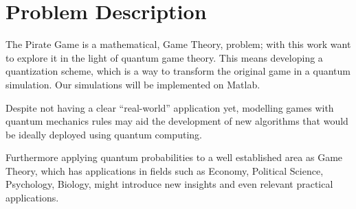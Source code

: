 \section{Problem Description}
\label{sec:int_problem}

The Pirate Game is a mathematical, Game Theory, problem; with this work want to explore it in the light of quantum game theory. This means developing a quantization scheme, which is a way to transform the original game in a quantum simulation. Our simulations will be implemented on Matlab.

Despite not having a clear ``real-world'' application yet, modelling games with quantum mechanics rules may aid the development of new algorithms that would be ideally deployed using quantum computing. 

Furthermore applying quantum probabilities to a well established area as Game Theory, which has applications in fields such as Economy, Political Science, Psychology, Biology, might introduce new insights and even relevant practical applications\cite{Eisert2008}. 



